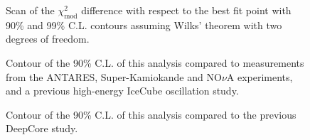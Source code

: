 \begin{figure}
    \centering
    
    \caption{Scan of the $\chi^2_{\mathrm{mod}}$ difference with respect to the best fit point with 90\% and 99\% C.L. contours assuming Wilks' theorem with two degrees of freedom.}
    \label{fig:sterile-contour-scan}
\end{figure}

\begin{figure}
    \centering

    
    \caption{Contour of the 90\% C.L. of this analysis compared to measurements from the ANTARES\cite{ANTARES:2018rtf}, Super-Kamiokande\cite{Super-Kamiokande:2014ndf} and NO$\nu$A\cite{nova-sterile} experiments, and a previous high-energy IceCube oscillation study\cite{MEOWS}.}
    \label{fig:sterile-contour-context}
\end{figure}

\begin{figure}
    \centering
    
    \caption{Contour of the 90\% C.L. of this analysis compared to the previous DeepCore study\cite{deepcore_sterile_2017}.}
    \label{fig:sterile-contour-leesard}
\end{figure}
